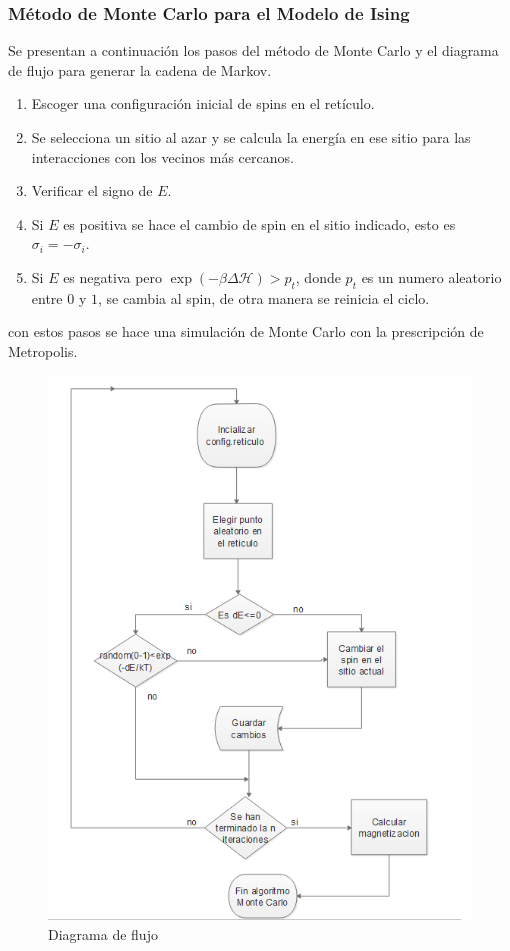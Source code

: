 \documentclass[a4paper]{article}
\begin{document}
\subsubsection{Método de Monte Carlo para el Modelo de Ising}
Se presentan a continuación los pasos del método de Monte Carlo y el diagrama de flujo para generar la cadena de Markov.
\begin{enumerate}
\item Escoger una configuración inicial de spins en el retículo.
\item Se selecciona un sitio al azar y se calcula la energía en ese sitio para las interacciones con los vecinos más cercanos. 
\item Verificar el signo de $E$.
\item Si $E$ es positiva se hace el cambio de spin en el sitio indicado, esto es $\sigma_i=-\sigma_i$.
\item Si $E$ es negativa pero $\exp(-\beta \Delta \mathcal{H})>p_t$, donde $p_t$ es un numero aleatorio entre $0$ y $1$, se cambia al spin, de otra manera se reinicia el ciclo.
\end{enumerate}
con estos pasos se hace una simulación de Monte Carlo con la prescripción de Metropolis.
\begin{figure}[H]
\begin{center}
\includegraphics[scale=0.5]{FluxDiagram.png} 
\end{center} 
\caption{Diagrama de flujo}
\end{figure}
\end{document}
